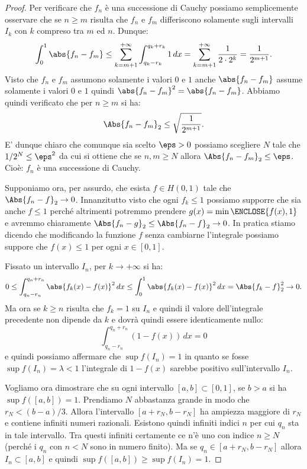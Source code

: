 \begin{proof}
Per verificare che $f_n$ è una successione di Cauchy possiamo semplicemente
osservare che se $n\ge m$ risulta che $f_n$ e $f_m$ differiscono solamente
sugli intervalli $I_k$ con $k$ compreso tra $m$ ed $n$. Dunque:
\[
  \int_0^1 \abs{f_n - f_m}
  \le \sum_{k=m+1}^{+\infty} \int_{q_k-r_k}^{q_k+r_k} 1\,dx
  = \sum_{k=m+1}^{+\infty}\frac{1}{2\cdot 2^k} = \frac{1}{2^{m+1}}.
\]
Visto che $f_n$ e $f_m$ assumono solamente i valori $0$ e $1$ anche $\abs{f_n-f_m}$
assume solamente i valori $0$ e $1$ quindi $\abs{f_n-f_m}^2=\abs{f_n-f_m}$.
Abbiamo quindi verificato che per $n\ge m$ si ha:
\[
  \Abs{ f_n - f_m}_2 \le \sqrt{\frac{1}{2^{m+1}}}.
\]
E' dunque chiaro che comunque sia scelto $\eps>0$ possiamo scegliere $N$
tale che $1/2^N \le \eps^2$ da cui si ottiene che se $n,m\ge N$
allora $\Abs{f_n-f_m}_2 \le \eps$. Cioè: $f_n$ è una successione di Cauchy.

Supponiamo ora, per assurdo, che esista $f\in H(0,1)$
tale che $\Abs{f_n-f}_2 \to 0$.
Innanzitutto visto che ogni $f_k\le 1$ possiamo supporre che sia anche $f\le 1$
perché altrimenti potremmo prendere $g(x) = \min\ENCLOSE{f(x),1}$ e avremmo
chiaramente $\Abs{f_n - g}_2 \le \Abs{f_n -f}_2 \to 0$. In pratica stiamo dicendo
che modificando la funzione $f$ senza cambiarne l'integrale possiamo suppore
che $f(x)\le 1$ per ogni $x\in[0,1]$.

Fissato un intervallo $I_n$, per $k\to +\infty$ si ha:
\[
  0\le \int_{q_n-r_n}^{q_n+r_n}\abs{f_k(x)-f(x)}^2\, dx
  \le \int_0^1 \abs{f_k(x)-f(x)}^2\, dx = \Abs{ f_k -f}_2^2 \to 0.
\]
Ma ora se $k\ge n$ risulta che $f_k=1$ su $I_n$ e quindi il valore dell'integrale
precedente non dipende da $k$ e dovrà quindi essere identicamente nullo:
\[
  \int_{q_n-r_n}^{q_n+r_n} (1-f(x)) \, dx = 0
\]
e quindi possiamo affermare che $\sup f(I_n) = 1$ in quanto se fosse
$\sup f(I_n) = \lambda < 1$
l'integrale di $1-f(x)$ sarebbe positivo
sull'intervallo $I_n$.

Vogliamo ora dimostrare che su ogni intervallo $[a,b]\subset[0,1]$, se $b>a$
si ha $\sup f([a,b])=1$. 
Prendiamo $N$ abbastanza grande in modo che $r_N < (b-a)/3$.
Allora l'intervallo $[a+r_N, b-r_N]$ ha ampiezza maggiore di $r_N$ e contiene infiniti
numeri razionali. 
Esistono quindi infiniti indici $n$ per cui $q_n$ sta in tale
intervallo. 
Tra questi infiniti certamente ce n'è uno con indice $n\ge N$
(perché i $q_n$ con $n<N$ sono in numero finito). 
Ma se $q_n \in [a+r_N,b-r_N]$
allora $I_n\subset[a,b]$ e quindi $\sup f([a,b])\ge \sup f(I_n) = 1$.


\end{proof}
